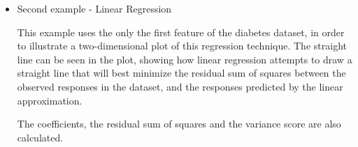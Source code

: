 \begin{itemize}
\begin{lstlisting}[frame=single]
# To apply a classifier on this data, we need to flatten the 
#image, to turn the data in a (samples, feature) matrix:
n_samples = len(digits.images)
data = digits.images.reshape((n_samples, -1))

# Create a classifier: a support vector classifier
classifier = svm.SVC(gamma=0.001)

# We learn the digits on the first half of the digits
classifier.fit(data[:n_samples //2],digits.target[:n_samples //2])

# Now predict the value of the digit on the second half:
expected = digits.target[n_samples // 2:]
predicted = classifier.predict(data[n_samples // 2:])

print("Classification report for classifier %s:\n%s\n"
      % (classifier, metrics.classification_report(expected, predicted)))
print("Confusion matrix:\n%s" % metrics.confusion_matrix(expected, predicted))

images_and_predictions = list(zip(digits.images[n_samples // 2:], predicted))
for index, (image, prediction) in enumerate(images_and_predictions[:4]):
    plt.subplot(2, 4, index + 5)
    plt.axis('off')
    plt.imshow(image, cmap=plt.cm.gray_r, interpolation='nearest')
    plt.title('Prediction: %i' % prediction)

plt.show()

\end{lstlisting}

\item{Second example - Linear Regression}

\tab This example uses the only the first feature of the diabetes dataset, in order to illustrate a two-dimensional plot of this regression technique. The straight line can be seen in the plot, showing how linear regression attempts to draw a straight line that will best minimize the residual sum of squares between the observed responses in the dataset, and the responses predicted by the linear approximation.

The coefficients, the residual sum of squares and the variance score are also calculated.\\


\end{itemize}
